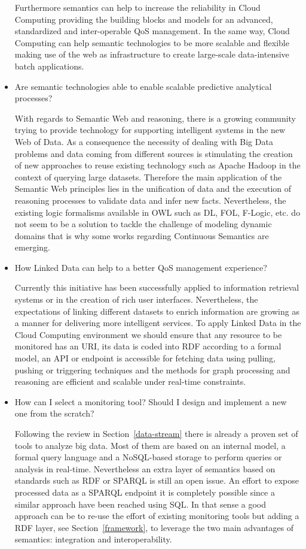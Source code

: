 \begin{itemize}
Furthermore semantics can help to increase the reliability in Cloud Computing providing the 
building blocks and models for an advanced, standardized and inter-operable QoS management. 
In the same way, Cloud Computing can help semantic technologies to be more scalable and flexible making use of the web as 
infrastructure to create large-scale data-intensive batch applications.


\item Are semantic technologies able to enable scalable predictive analytical processes?

With regards to Semantic Web and reasoning, there is a growing community 
trying to provide technology for supporting intelligent systems in the new Web 
of Data. As a consequence the necessity of dealing with Big Data problems and 
data coming from different sources is stimulating the creation of new approaches 
to reuse existing technology such as Apache Hadoop in the context of querying 
large datasets. Therefore the main application of the Semantic Web principles 
lies in the unification of data and the execution of reasoning processes to 
validate data and infer new facts. Nevertheless, the existing logic formalisms 
available in OWL such as DL, FOL, F-Logic, etc. do not seem to be a solution to 
tackle the challenge of modeling dynamic domains that is why some works 
regarding Continuous Semantics are emerging.

\item How Linked Data can help to a better QoS management experience?

Currently this initiative has been successfully applied to 
information retrieval systems or in the creation of rich user interfaces. 
Nevertheless, the expectations of linking different datasets to enrich 
information are growing as a manner for delivering more intelligent services. To 
apply Linked Data in the Cloud Computing environment we should ensure that any 
resource to be monitored has an URI, its data is coded into RDF according to a 
formal model, an API or endpoint is accessible for fetching data using pulling, 
pushing or triggering techniques and the methods for graph processing and 
reasoning are efficient and scalable under real-time constraints.

\item How can I select a monitoring tool? Should I design and implement a new one from the scratch?

Following the review in Section~\ref{data-stream} there is already a proven set of tools to analyze 
big data. Most of them are based on an internal model, a formal query language and a NoSQL-based storage 
to perform queries or analysis in real-time. Nevertheless an extra layer of semantics based on standards 
such as RDF or SPARQL is still an open issue. An effort to expose processed data as a SPARQL endpoint it is 
completely possible since a similar approach have been reached using SQL. In that sense a good approach can 
be to re-use the effort of existing monitoring tools but adding a RDF layer, see Section~\ref{framework}, 
to leverage the two main advantages of semantics: integration and interoperability.


\end{itemize}
